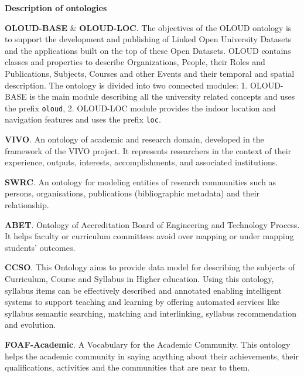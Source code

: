 

\medskip
\noindent \textbf{Description of ontologies}

\medskip
\noindent \textbf{OLOUD-BASE} \& \textbf{OLOUD-LOC}. \cite{10.12700/APH.14.4.2017.4.4} The objectives of the OLOUD ontology is to support the development and publishing of Linked Open University Datasets and the applications built on the top of these Open Datasets. OLOUD contains classes and properties to describe Organizations, People, their Roles and Publications, Subjects, Courses and other Events and their temporal and spatial description. The ontology is divided into two connected modules: 1. OLOUD-BASE is the main module describing all the university related concepts and uses the prefix \texttt{oloud}, 2. OLOUD-LOC module provides the indoor location and navigation features and uses the prefix \texttt{loc}.

\medskip
\noindent \textbf{VIVO}. \cite{DBLP:series/synthesis/2012Borner} An ontology of academic and research domain, developed in the framework of the VIVO project. It represents researchers in the context of their experience, outputs, interests, accomplishments, and associated institutions.

\medskip
\noindent \textbf{SWRC}. \cite{DBLP:conf/epia/SureBHHO05} An ontology for modeling entities of research communities such as persons, organisations, publications (bibliographic metadata) and their relationship.

\medskip
\noindent \textbf{ABET}. \cite{10.14569/IJACSA.2016.070717} Ontology of Accreditation Board of Engineering and Technology Process. It helps faculty  or  curriculum  committees  avoid  over  mapping  or  under mapping students' outcomes.

\medskip
\noindent \textbf{CCSO}. \cite{DBLP:conf/esws/KatisKAV18} This Ontology aims to provide data model for describing the subjects of Curriculum, Course and Syllabus in Higher education. Using this ontology, syllabus items can be effectively described and annotated enabling intelligent systems to support teaching and learning by offering automated services like syllabus semantic searching, matching and interlinking, syllabus recommendation and evolution.

\medskip
\noindent \textbf{FOAF-Academic}. \cite{DBLP:conf/incos/KalemiM11} A Vocabulary for the Academic Community. This ontology helps the academic community in saying anything about their achievements, their qualifications, activities and the communities that are near to them.

